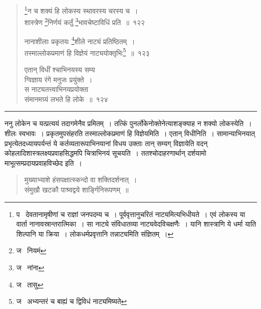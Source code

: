 \documentclass[11pt, openany]{book}
\begin{document}
\newpage

\begin{quote}
{\na \renewcommand{\thefootnote}{1}\footnote{प \textendash\  देवतानामृषीणां च राज्ञां जनपदम्य च~। पूर्ववृत्तानुचरितं नाट्यमित्यभिधीयते~। एवं लोकस्य या वार्ता नानावस्रान्तरात्मिका~। सा नाट्ये संविधातव्या नाट्यवेदविचक्षणैः~। यानि शास्त्राणि ये धर्मा याति शिल्पानि या क्रिया~। लोकधर्मप्रवृत्तानि तन्नाट्यमिति संज्ञितम्~।}न च शक्यं हि लोकस्य स्थावरस्य चरस्य च~।\\
शास्त्रेण \renewcommand{\thefootnote}{2}\footnote{ज \textendash\  नियमं}निर्णयं कर्तुं \renewcommand{\thefootnote}{3}\footnote{ज \textendash\  नांना}भावचेष्टाविधिं प्रति~॥~१२२

नानाशीलाः प्रकृतयः \renewcommand{\thefootnote}{4}\footnote{ज \textendash\  तासु}शीले नाट्यं प्रतिष्ठितम्~।\\
तस्माल्लोकप्रमाणं हि विज्ञेयं नाट्ययोक्तृभिः\renewcommand{\thefootnote}{5}\footnote{ज \textendash\  अभ्यन्तरं च बाह्यं च द्विविधं नाट्यमिष्यते}~॥~१२३

एतान् विधीं श्चाभिनयस्य सम्य\textendash \\
ग्विज्ञाय रंगे मनुजः प्रयुंक्ते~।\\
स नाट्यतत्त्वाभिनयप्रयोक्ता\\
संमानमग्र्यं लभते हि लोके~॥~१२४}
\end{quote}

\hrule

\vspace{2mm}
ननु लोकेन च यत्प्रत्ययं तदागमेनैव प्रमितम्~। तत्किं पुनर्लोकेनोक्तेनेत्याशङ्क्याह न शक्यो लोकस्येति~। शीलः स्वभावः~। प्रकृतमुपसंहरति तस्माल्लोकप्रमाणं हि विज्ञेयमिति~। एतान् विधीनिति~। सामान्याभिनयात् प्रभृत्येतदध्यायपर्यन्तं ये कर्तव्यतारूपाभिनयानां विधय उक्ताः तान् सम्यग् विज्ञायेति वदन् कोहलादिशास्त्रलक्ष्यप्रवाहसिद्धमपि चित्राभिनयं सूचयति~। ततश्चोदाहरणार्थान् दर्शयामो माभूत्सम्प्रदायप्रवाहविच्छेद इति~।

\begin{quote}
{\qt मुख्याभ्याशे हंसपक्षात्स्कन्दो वा शक्तिदर्शनात्~।\\
संमुखौ खटकौ पाश्र्वद्वये शार्ङ्गिनिरूपणम्~॥}
\end{quote}

\newpage
\end{document}
